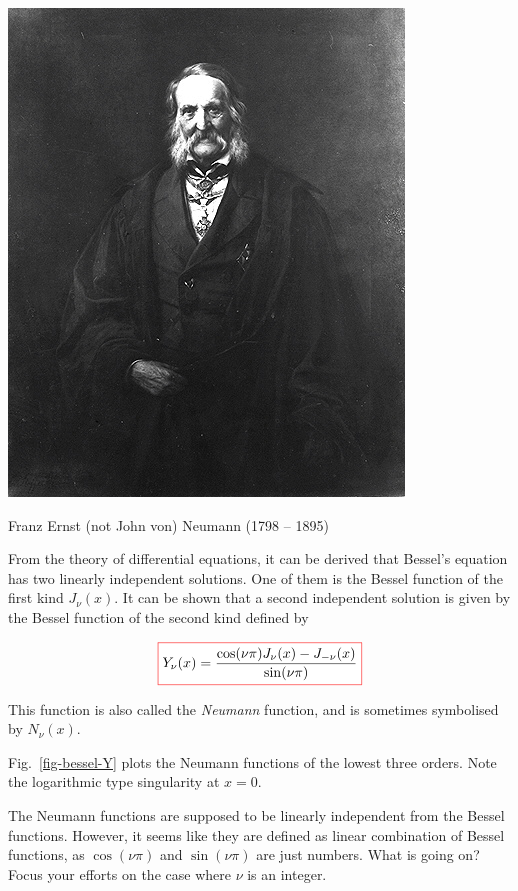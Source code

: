 \pagebreak



\begin{marginfigure}[0.3cm]
  \includegraphics{bessel/figures/f_neumann}
  \caption{Franz Ernst (not John von) Neumann (1798 – 1895)}
\end{marginfigure}

From the theory of differential equations, it can be derived that Bessel's equation has two linearly independent solutions. One of them is the Bessel function of the first kind $J_\nu(x)$. It can be shown that a second independent solution is given by the Bessel function of the second kind defined by

\begin{equation}
\fbox{$\displaystyle
Y_\nu(x) = \frac{\cos(\nu \pi)J_\nu(x) - J_{-\nu}(x)}{\sin(\nu \pi)}
$}
\end{equation} 

This function is also called the \emph{Neumann} function, and is sometimes symbolised by $N_\nu(x)$.

Fig.~\ref{fig-bessel-Y} plots the Neumann functions of the lowest three orders. Note the logarithmic type singularity at $x=0$.

\begin{exer}
The Neumann functions are supposed to be linearly independent from the Bessel functions. However, it seems like they are defined as linear combination of Bessel functions, as $\cos(\nu \pi)$ and $\sin(\nu \pi)$ are just numbers. What is going on? Focus your efforts on the case where $\nu$ is an integer.
\end{exer}

